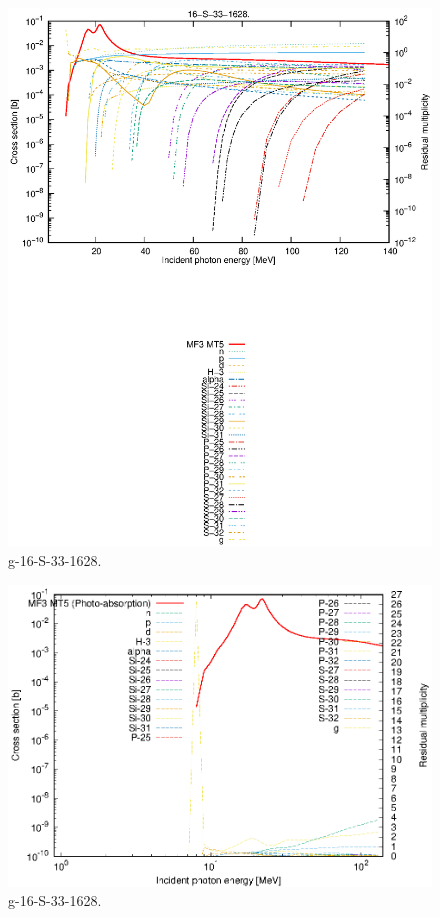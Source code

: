 \begin{figure}
 \includegraphics[width=\linewidth]{eps/g_16-S-33_1628.eps}
  \caption{g-16-S-33-1628.}
\end{figure}
\newpage \clearpage

\begin{figure}
 \includegraphics[width=\linewidth]{eps-log/g_16-S-33_1628.eps}
 \caption{g-16-S-33-1628.}
\end{figure}
\newpage \clearpage

